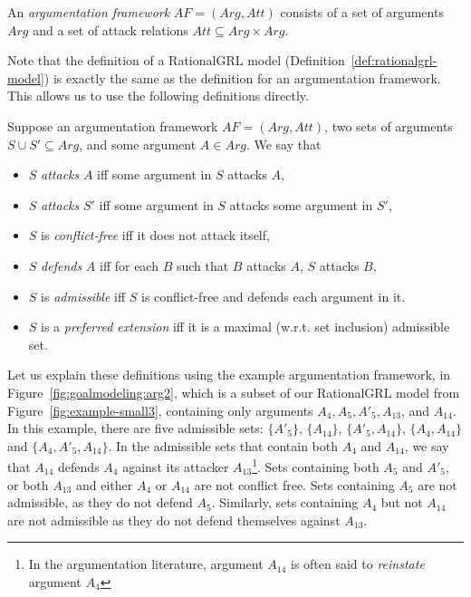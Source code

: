 \begin{definition}
\label{def:argumentation-framework}
An \emph{argumentation framework} $AF=(Arg,Att)$ consists of a set of arguments $Arg$ and a set of attack relations $Att\subseteq Arg\times Arg.$
\end{definition}

Note that the definition of a RationalGRL model (Definition~\ref{def:rationalgrl-model}) is exactly the same as the definition for an argumentation framework. This allows us to use the following definitions directly.

\begin{definition} \label{def:semantics}Suppose an argumentation framework $AF=(Arg,Att)$, two sets of arguments $S\cup S'\subseteq Arg$, and some argument $A\in Arg$. We say that
\begin{itemize}
\item $S$ \emph{attacks} $A$ iff some argument in $S$ attacks $A$,
\item $S$ \emph{attacks} $S'$ iff some argument in $S$ attacks some argument in $S'$,
\item $S$ is \emph{conflict-free} iff it does not attack itself,
\item $S$ \emph{defends} $A$ iff for each $B$ such that $B$ attacks $A$, $S$ attacks $B$,
\item $S$ is \emph{admissible} iff $S$ is conflict-free and defends each argument in it.
\item $S$ is a \emph{preferred extension} iff it is a maximal (w.r.t. set inclusion) admissible set.
\end{itemize}
\end{definition}

Let us explain these definitions using the example argumentation framework, in Figure~\ref{fig:goalmodeling:arg2}, which is a subset of our RationalGRL model from Figure~\ref{fig:example-small3}, containing only arguments $A_4, A_{5},A'_{5},A_{13}$, and $A_{14}$. In this example, there are five admissible sets: $\{A'_{5}\}$, $\{A_{14}\}$, $\{A'_{5},A_{14}\}$, $\{A_4, A_{14}\}$ and $\{A_4, A'_5, A_{14}\}$. In the admissible sets that contain both $A_{4}$ and $A_{14}$, we say that $A_{14}$ defends $A_4$ against its attacker $A_{13}$\footnote{In the argumentation literature, argument $A_{14}$ is often said to \emph{reinstate} argument $A_{4}$}. Sets containing both $A_{5}$ and $A'_{5}$, or both $A_{13}$ and either $A_4$ or $A_{14}$ are not conflict free. Sets containing $A_5$ are not admissible, as they do not defend $A_5$. Similarly, sets containing $A_4$ but not $A_{14}$ are not admissible as they do not defend themselves against $A_{13}$. 


